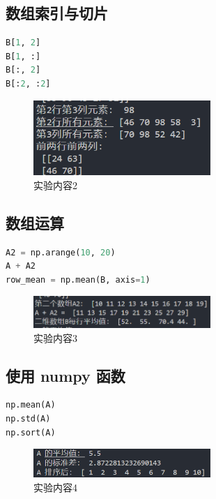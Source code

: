 \documentclass{article}
\begin{document}
\subsection{数组索引与切片}
\begin{lstlisting}[language=Python]
B[1, 2]
B[1, :]
B[:, 2]
B[:2, :2]
\end{lstlisting}

\begin{figure}[H]
  \centering
  \includegraphics[width=0.6\textwidth]{image1.png}
  \caption{实验内容2}
\end{figure}

\subsection{数组运算}
\begin{lstlisting}[language=Python]
A2 = np.arange(10, 20)
A + A2
row_mean = np.mean(B, axis=1)
\end{lstlisting}

\begin{figure}[H]
  \centering
  \includegraphics[width=0.6\textwidth]{image2.png}
  \caption{实验内容3}
\end{figure}

\subsection{使用 numpy 函数}
\begin{lstlisting}[language=Python]
np.mean(A)
np.std(A)
np.sort(A)
\end{lstlisting}

\begin{figure}[H]
  \centering
  \includegraphics[width=0.6\textwidth]{image3.png}
  \caption{实验内容4}
\end{figure}
\end{document}
